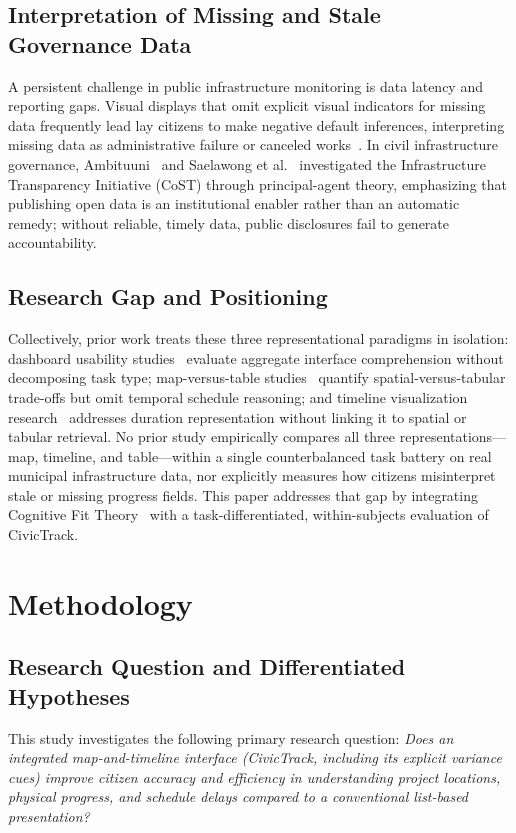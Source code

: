 \documentclass[runningheads]{llncs}
\begin{document}
\subsection{Interpretation of Missing and Stale Governance Data}
A persistent challenge in public infrastructure monitoring is data latency and reporting gaps. Visual displays that omit explicit visual indicators for missing data frequently lead lay citizens to make negative default inferences, interpreting missing data as administrative failure or canceled works~\cite{fernstad2022explore}. In civil infrastructure governance, Ambituuni~\cite{ambituuni2025infrastructure} and Saelawong et al.~\cite{saelawong2024transparency} investigated the Infrastructure Transparency Initiative (CoST) through principal-agent theory, emphasizing that publishing open data is an institutional enabler rather than an automatic remedy; without reliable, timely data, public disclosures fail to generate accountability.

\subsection{Research Gap and Positioning}
Collectively, prior work treats these three representational paradigms in isolation: dashboard usability studies~\cite{ansari2022enhancing,chokki2022engaging,matheus2021design,nikiforova2021open} evaluate aggregate interface comprehension without decomposing task type; map-versus-table studies~\cite{lehto2022landscape,kytta2023prioritizing} quantify spatial-versus-tabular trade-offs but omit temporal schedule reasoning; and timeline visualization research~\cite{ayalew2024developing,soni2024survey} addresses duration representation without linking it to spatial or tabular retrieval. No prior study empirically compares all three representations---map, timeline, and table---within a single counterbalanced task battery on real municipal infrastructure data, nor explicitly measures how citizens misinterpret stale or missing progress fields. This paper addresses that gap by integrating Cognitive Fit Theory~\cite{bina2023incorporating,bacic2022advancing} with a task-differentiated, within-subjects evaluation of CivicTrack.

\section{Methodology}

\subsection{Research Question and Differentiated Hypotheses}
This study investigates the following primary research question: \emph{Does an integrated map-and-timeline interface (CivicTrack, including its explicit variance cues) improve citizen accuracy and efficiency in understanding project locations, physical progress, and schedule delays compared to a conventional list-based presentation?}
\end{document}
